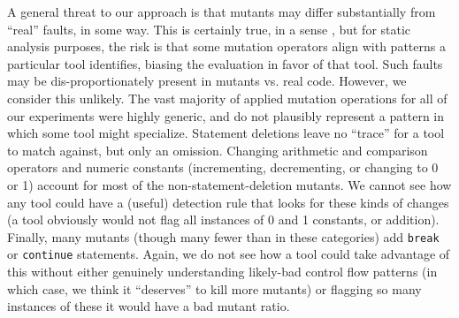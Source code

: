 A general threat to our approach is that mutants may differ substantially from ``real'' faults, in some way.  This is certainly true, in a sense \cite{GopinathMutants}, but for static analysis purposes, the risk is that some mutation operators align with patterns a particular tool identifies, biasing the evaluation in favor of that tool.  Such faults may be dis-proportionately present in mutants vs. real code.  However, we consider this unlikely.  The vast majority of applied mutation operations for all of our experiments were highly generic, and do not plausibly represent a pattern in which some tool might specialize.  Statement deletions leave no ``trace'' for a tool to match against, but only an omission.  Changing arithmetic and comparison operators and numeric constants (incrementing, decrementing, or changing to 0 or 1) account for most of the non-statement-deletion mutants.  We cannot see how any tool could have a (useful) detection rule that looks for these kinds of changes (a tool obviously would not flag all instances of 0 and 1 constants, or addition).  Finally, many mutants (though many fewer than in these categories) add {\tt break} or {\tt continue} statements.  Again, we do not see how a tool could take advantage of this without either genuinely understanding likely-bad control flow patterns (in which case, we think it ``deserves'' to kill more mutants) or flagging so many instances of these it would have a bad mutant ratio. 